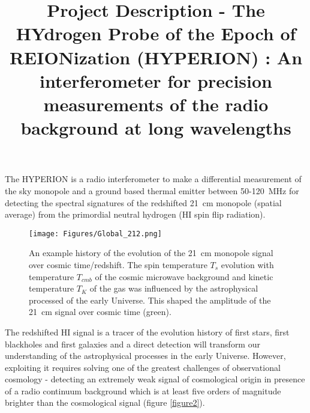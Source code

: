 \documentclass[12pt]{amsart}
\title{Project Description - The HYdrogen Probe of the Epoch of REIONization (HYPERION) : An interferometer for precision measurements of the radio background at long wavelengths}
\begin{document}
\maketitle

The HYPERION is a radio interferometer to make a differential measurement of the sky monopole and a ground based thermal emitter between 50-120~MHz for detecting the spectral signatures of the redshifted 21~cm monopole (spatial average) from the primordial neutral hydrogen (HI spin flip radiation). 
\begin{figure}[!ht]
\centering
\texttt{[image: Figures/Global\_212.png]}
 \caption{\small
An example history of the evolution of the 21~cm monopole signal over cosmic time/redshift. The spin temperature $T_{s}$ evolution %
with temperature $T_{cmb}$ of the cosmic microwave background and kinetic temperature $T_{K}$ of the gas was influenced by the astrophysical processed of the early Universe. This shaped the amplitude of the 21~cm signal over cosmic time (green).
}
\label{figure1}
\end{figure}
The redshifted HI signal is a tracer of the evolution history of first stars, first blackholes and first galaxies and a direct detection will transform our understanding of the astrophysical processes in the early Universe.
However, exploiting it requires solving one of the greatest challenges of observational cosmology - detecting an extremely weak signal of cosmological origin in presence of a radio continuum background which is at least five orders of magnitude brighter than the cosmological signal (figure \ref{figure2}). 
\end{document}
